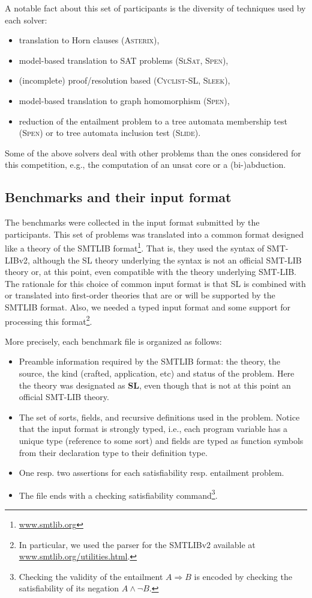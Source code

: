 \documentclass{llncs}
\newcommand{\limp}{\Rightarrow}
\newcommand{\ASTERIX}{\textsc{Asterix}}
\newcommand{\CYCLIST}{\textsc{Cyclist-SL}}
\newcommand{\SLEEK}{\textsc{Sleek}}
\newcommand{\SLIDE}{\textsc{Slide}}
\newcommand{\SLSAT}{\textsc{SlSat}}
\newcommand{\SPEN}{\textsc{Spen}}
\begin{document}
A notable fact about this set of participants is the diversity of techniques used by each solver:
\begin{itemize}
\item translation to Horn clauses (\ASTERIX),
\item model-based translation to SAT problems (\SLSAT, \SPEN),
\item (incomplete) proof/resolution based (\CYCLIST, \SLEEK),
\item model-based translation to graph homomorphism (\SPEN),
\item reduction of the entailment problem to a tree automata membership test (\SPEN) or to tree automata inclusion test (\SLIDE).
\end{itemize}

Some of the above solvers deal with other problems than the ones considered for this competition, e.g., the computation of an unsat core or a (bi-)abduction.


\subsection{Benchmarks and their input format}
The benchmarks were collected in the input format submitted by the participants.
This set of problems was translated into a common format designed like a theory of the SMTLIB format\footnote{\url{www.smtlib.org}}. That is, they used the syntax of SMT-LIBv2, although the SL theory underlying the syntax is not an official SMT-LIB theory or, at this point, even compatible with the theory underlying SMT-LIB.
The rationale for this choice of common input format is 
that SL is combined with or translated into first-order theories that are or will be supported by the SMTLIB format.
Also, we needed a typed input format and some support for processing this format\footnote{In particular, we used the parser for the SMTLIBv2 available at \url{www.smtlib.org/utilities.html}.}.
 
More precisely, each benchmark file is organized as follows:
\begin{itemize}
\item Preamble information required by the SMTLIB format: the theory, the source, the kind (crafted, application, etc) and status of the problem.  Here the theory was designated as \textbf{SL}, even though that is not at this point an official SMT-LIB theory. %
\item The set of sorts, fields, and recursive definitions used in the problem. Notice that the input format is strongly typed, i.e., each program variable has a unique type (reference to some sort) and 
fields are typed as function symbols from their declaration type to their definition type. 
\item One resp. two assertions for each satisfiability resp. entailment problem. 
\item The file ends with a checking satisfiability command\footnote{Checking the validity of the entailment $A\limp B$ is encoded by checking the satisfiability of its negation $A \land \lnot B$.}.
\end{itemize}
\end{document}
